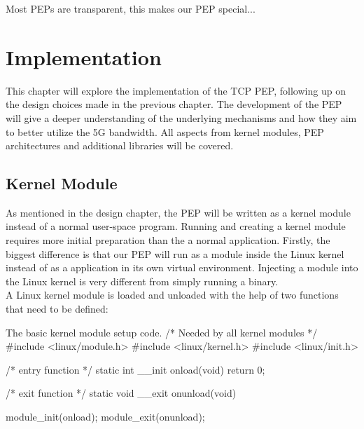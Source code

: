 \documentclass[a4paper,english, 11pt]{report}
\begin{document}
Most PEPs are transparent, this makes our PEP special...




\chapter{Implementation}
This chapter will explore the implementation of the TCP PEP, following up on the design choices made in the previous chapter. The development of the PEP will give a deeper understanding of the underlying mechanisms and how they aim to better utilize the 5G bandwidth. All aspects from kernel modules, PEP architectures and additional libraries will be covered.

\section{Kernel Module}
As mentioned in the design chapter, the PEP will be written as a kernel module instead of a normal user-space program. Running and creating a kernel module requires more initial preparation than the a normal application. Firstly, the biggest difference is that our PEP will run as a module inside the Linux kernel instead of as a application in its own virtual environment. Injecting a module into the Linux kernel is very different from simply running a binary.\\

A Linux kernel module is loaded and unloaded with the help of two functions that need to be defined:\\

\begin{autonumlstlisting}[label=lst:module_example]{The basic kernel module setup code.}
/* Needed by all kernel modules */
#include <linux/module.h> 
#include <linux/kernel.h>
#include <linux/init.h>

/* entry function */
static int __init onload(void) {
    return 0;
}

/* exit function */
static void __exit onunload(void) {
    
}

module_init(onload);
module_exit(onunload);
\end{autonumlstlisting}
\end{document}
